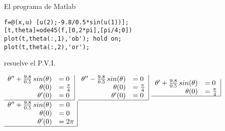 \begin{pregunta}
\begin{cuerpo}
El programa de Matlab 
\begin{lstlisting}
f=@(x,u) [u(2);-9.8/0.5*sin(u(1))];
[t,theta]=ode45(f,[0,2*pi],[pi/4;0])
plot(t,theta(:,1),'ob'); hold on;
plot(t,theta(:,2),'or');
\end{lstlisting}
resuelve el P.V.I.\\
\end{cuerpo}

\begin{multicols}{2}
\begin{alternativas}
{
$\begin{array}{rl|}
\theta''+\frac{9.8}{0.5} \,sin(\theta)	&=0\\
\theta(0)	&=\frac{\pi}{4}\\
\theta'(0)	&=0\\ \hline
\end{array}$
}
{
$\begin{array}{rl|}
\theta''-\frac{9.8}{0.5} \,sin(\theta)	&=0\\
\theta(0)	&=\frac{\pi}{4}\\
\theta'(0)	&=0\\ \hline
\end{array}$						
}
{
$\begin{array}{rl|}
\theta'+\frac{9.8}{0.5} \,sin(\theta)	&=0\\
\theta(0)	&=\frac{\pi}{4}\\ \hline
\end{array}$						
}
{
$\begin{array}{rl|}
\theta''+\frac{9.8}{0.5} \,sin(\theta)	&=0\\
\theta(0)	&=0\\
\theta'(0)	&=2\pi\\ \hline
\end{array}$								
}
\end{alternativas}
\end{multicols}
\justificacion{0cm}
\end{pregunta}
